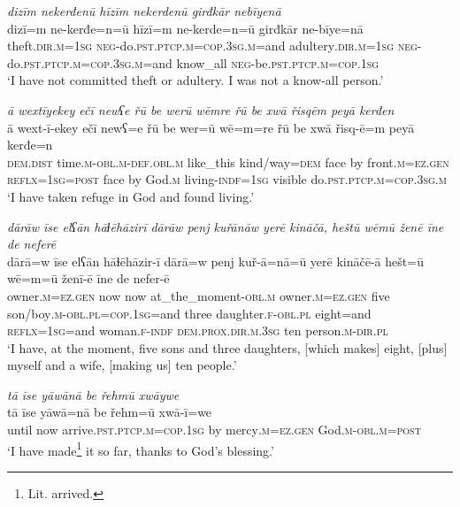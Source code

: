 \ea \label{ŽM.14}
\textit{dizīm nekerđenū hīzīm nekerdenū girđkār nebīyenā} \\ 
\gll dizī=m ne-kerđe=n=ū hīzī=m ne-kerde=n=ū girđkār ne-bīye=nā \\ 
 theft\textsc{.dir}\textsc{.m}\textsc{=\textsc{1sg}} \textsc{neg-}do\textsc{.pst}\textsc{.ptcp}\textsc{.m}\textsc{=cop}\textsc{.3sg}\textsc{.m}=and adultery\textsc{.dir}\textsc{.m}\textsc{=\textsc{1sg}} \textsc{neg-}do\textsc{.pst}\textsc{.ptcp}\textsc{.m}\textsc{=cop}\textsc{.3sg}\textsc{.m}=and know\_all \textsc{neg-}be\textsc{.pst}\textsc{.ptcp}\textsc{.m}\textsc{=cop}\textsc{.\textsc{1sg}} \\ 
\glt `I have not committed theft or adultery. I was not a know-all person.'
\z 
 
\ea \label{ŽM.15}
\textit{ā wextīyekey ečī newʕe řū be werū wēmre řū be xwā řisqēm peyā kerđen} \\ 
\gll ā wext-ī-ekey ečī newʕ=e řū be wer=ū wē=m=re řū be xwā řisq-ē=m peyā kerđe=n \\ 
 \textsc{dem.dist} time\textsc{.m}\textsc{-obl}\textsc{.m}\textsc{-def}\textsc{.obl}\textsc{.m} like\_this kind/way\textsc{=dem} face by front\textsc{.m}\textsc{=ez.gen} \textsc{reflx}\textsc{=\textsc{1sg}}\textsc{=\textsc{post}} face by God\textsc{.m} living\textsc{-indf}\textsc{=\textsc{1sg}} visible do\textsc{.pst}\textsc{.ptcp}\textsc{.m}\textsc{=cop}\textsc{.3sg}\textsc{.m} \\ 
\glt `I have taken refuge in God and found living.'
\z 
 
\ea \label{ŽM.16}
\textit{dārāw īse elʕān hāɫēhāzirī dārāw penj kuřānāw yerē kināčā, heštū wēmū ženē īne de neferē} \\ 
\gll dārā=w īse elʕān hāɫēhāzir-ī dārā=w penj kuř-ā=nā=ū yerē kināčē-ā hešt=ū wē=m=ū ženī-ē īne de nefer-ē \\ 
 owner\textsc{.m}\textsc{=ez.gen} now now at\_the\_moment\textsc{-obl}\textsc{.m} owner\textsc{.m}\textsc{=ez.gen} five son/boy\textsc{.m}\textsc{-obl}\textsc{.pl}\textsc{=cop}\textsc{.\textsc{1sg}}=and three daughter\textsc{.f}\textsc{-obl}\textsc{.pl} eight=and \textsc{reflx}\textsc{=\textsc{1sg}}=and woman\textsc{.f}\textsc{-indf} \textsc{dem.prox}\textsc{.dir}\textsc{.m}\textsc{.3sg} ten person\textsc{.m}\textsc{-dir}\textsc{.pl} \\ 
\glt `I have, at the moment, five sons and three daughters, [which makes] eight, [plus] myself and a wife, [making us] ten people.'
\z 
 
\ea \label{ŽM.17}
\textit{tā īse yāwānā be řehmū xwāywe} \\ 
\gll tā īse yāwā=nā be řehm=ū xwā-ī=we \\ 
 until now arrive\textsc{.pst}\textsc{.ptcp}\textsc{.m}\textsc{=cop}\textsc{.\textsc{1sg}} by mercy\textsc{.m}\textsc{=ez.gen} God\textsc{.m}\textsc{-obl}\textsc{.m}\textsc{=\textsc{post}} \\ 
\glt `I have made\footnote{Lit. arrived.} it so far, thanks to God's blessing.'
\z 
 
